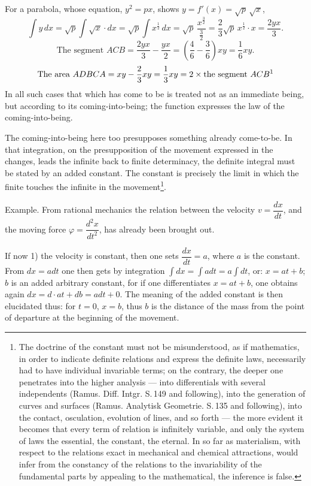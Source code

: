 \documentclass[12pt]{book}
\begin{document}
For a parabola, whose equation, $y^{2} = px$, shows
$y = f'(x) = \sqrt{p}\,\sqrt{x}$,
\[
\int y\,dx = \sqrt{p}\int \sqrt{x}\cdot dx = \sqrt{p}\int x^{\frac12}\,dx
  = \sqrt{p}\,\frac{x^{\frac{3}{2}}}{\frac{3}{2}}
  = \frac{2}{3}\sqrt{p}\,x^{\frac12}\cdot x = \frac{2yx}{3}.
\]
\[
\text{The segment } ACB = \frac{2yx}{3} - \frac{yx}{2}
  = \left(\frac{4}{6} - \frac{3}{6}\right)xy = \frac{1}{6}xy.
\]
\[
\text{The area } ADBCA = xy - \frac{2}{3}xy = \frac{1}{3}xy
  = 2\times \text{the segment } ACB\text{\footnotemark}
\]
In all such cases that which has come to be is treated not as an immediate
being, but according to its coming-into-being; the function expresses the law of
the coming-into-being.

The coming-into-being here too presupposes something already come-to-be. In that
integration, on the presupposition of the movement expressed in the changes,
leads the infinite back to finite determinacy, the definite integral must
be stated by an added constant. The constant is precisely
the limit in which the finite touches the infinite in the
movement\footnote{The doctrine of the constant must not be misunderstood, as if
mathematics, in order to indicate definite relations and express the definite
laws, necessarily had to have individual invariable terms; on the contrary,
the deeper one penetrates into the higher analysis --- into differentials with
several independents (Ramus. Diff. Intgr. S.\,149 and following), into the
generation of curves and surfaces (Ramus. Analytisk Geometrie. S.\,135 and
following), into the contact, osculation, evolution of lines, and so forth --- the
more evident it becomes that every term of relation is infinitely variable, and only
the system of laws the essential, the constant, the eternal. In so far as
materialism, with respect to the relations exact in mechanical and chemical
attractions, would infer from the constancy of the relations to the invariability of
the fundamental parts by appealing to the mathematical, the inference is false.}.

Example. From rational mechanics the relation between the velocity
$v = \dfrac{dx}{dt}$, and the moving force
$\varphi = \dfrac{d^{2}x}{dt^{2}}$, has already been brought out.

If now 1) the velocity is constant, then one sets $\dfrac{dx}{dt} = a$, where
$a$ is the constant. From $dx = adt$ one then gets by integration
$\int dx = \int adt = a\int dt$, or: $x = at + b$; $b$ is an
added arbitrary constant, for if one differentiates $x = at + b$,
one obtains again $dx = d\cdot at + db = adt + 0$. The meaning of the
added constant is then elucidated thus: for $t = 0$, $x = b$, thus
$b$ is the distance of the mass from the point of departure at the beginning of the
movement.
\end{document}
